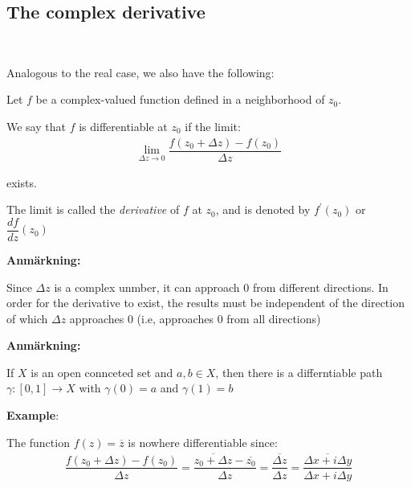 \subsection{The complex derivative}\hfill\\\par
\noindent Analogous to the real case, we also have the following:
\par\bigskip
\begin{theo}[Differentiability]{}
  Let $f$ be a complex-valued function defined in a neighborhood of $z_0$.\par
  \noindent We say that $f$ is differentiable at $z_0$ if the limit:
  \begin{equation*}
    \begin{gathered}
      \lim_{\Delta z\to0}\dfrac{f(z_0+\Delta z)-f(z_0)}{\Delta z}
    \end{gathered}
  \end{equation*}\par
  \noindent exists.\par
  \noindent The limit is called the \textit{derivative} of $f$ at $z_0$, and is denoted by $f^{\prime}(z_0)$ or $\dfrac{df}{dz}(z_0)$
\end{theo}
\par\bigskip
\noindent\textbf{Anmärkning:}\par
\noindent Since $\Delta z$ is a complex unmber, it can approach $0$ from different directions. In order for the derivative to exist, the results must be independent of the direction of which $\Delta z$ approaches 0 (i.e, approaches 0 from all directions)
\par\bigskip
\noindent\textbf{Anmärkning:}\par
\noindent If $X$ is an open connceted set and $a,b\in X$, then there is a differntiable path $\gamma:[0,1]\to X$ with $\gamma(0) = a$ and $\gamma(1) = b$
\par\bigskip
\noindent\textbf{Example}:\par
\noindent The function $f(z) = \overline{z}$ is nowhere differentiable since:
\begin{equation*}
  \begin{gathered}
    \dfrac{f(z_0+\Delta z)-f(z_0)}{\Delta z} = \dfrac{\overline{z_0+\Delta z}-\overline{z_0}}{\Delta z} = \dfrac{\overline{\Delta z}}{\Delta z} = \dfrac{\overline{\Delta x+i\Delta y}}{\Delta x+i\Delta y}
  \end{gathered}
\end{equation*}\par
